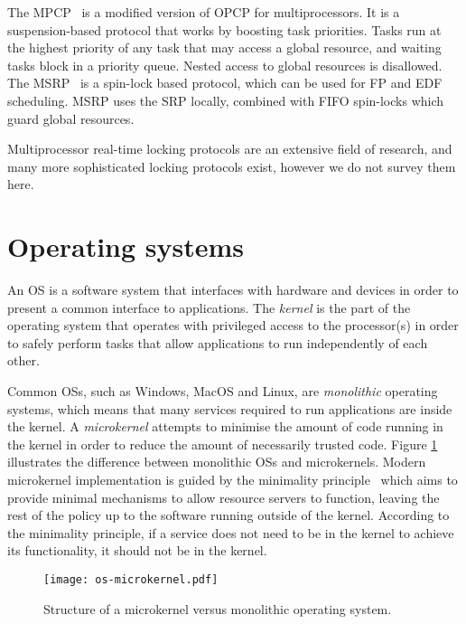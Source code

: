 The \gls{MPCP}~\citep{Rajkumar_90} is a modified version of \gls{OPCP} for multiprocessors. It is a
suspension-based protocol that works by boosting task priorities. Tasks run at the highest priority
of any task that may access a global resource, and waiting tasks block in a priority queue. Nested
access to global resources is disallowed. The \gls{MSRP}~\citep{Gai_DL_03} is a spin-lock based
protocol, which can be used for \gls{FP} and \gls{EDF} scheduling. \gls{MSRP} uses the \gls{SRP} locally,
combined with \gls{FIFO} spin-locks which guard global resources. 

Multiprocessor real-time locking protocols are an extensive field of research, and 
many more sophisticated locking protocols exist, however we do not survey them here.

\section{Operating systems}
\label{sec:background-operating-systems}

An \gls{OS} is a software system that interfaces with hardware and devices in order to present a
common interface to applications.  The \emph{kernel} is the part of the operating system that
operates with privileged access to the processor(s) in order to safely perform tasks that allow
applications to run independently of each other.

Common \glspl{OS}, such as Windows, MacOS and Linux, are \emph{monolithic} operating systems,
which means that many services required to run applications are inside the kernel.  A \emph{microkernel}
attempts to minimise the amount of code running in the kernel in order to reduce the amount
of necessarily
trusted code.  Figure \ref{fig:os-microkernel} illustrates the difference between monolithic
\glspl{OS} and microkernels.  Modern microkernel implementation is guided by the minimality
principle~\citep{Liedtke_95} which aims to provide minimal mechanisms to allow resource servers to
function, leaving the rest of the policy up to the software running outside of the kernel. According
to the minimality principle, if a service does not need to be in the kernel to achieve its
functionality, it should not be in the kernel.

\begin{figure}
	\begin{center}
		\leavevmode
        \texttt{[image: os-microkernel.pdf]}
		\caption{Structure of a microkernel versus monolithic operating system.}
		\label{fig:os-microkernel}
	\end{center}
\end{figure}

